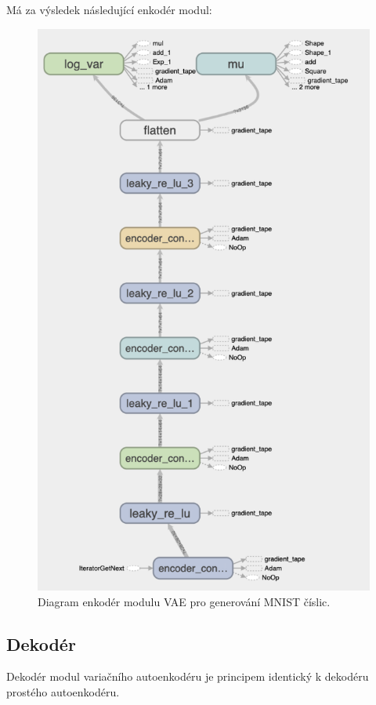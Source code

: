 Má za výsledek následující enkodér modul:
\begin{figure}[H]
    \centering
    \includegraphics{figures/vae_model_encoder.png}
    \caption{Diagram enkodér modulu VAE pro generování MNIST číslic.}
    \label{fig:vae_model_encoder}
\end{figure}

\subsection{Dekodér}
Dekodér modul variačního autoenkodéru je principem identický k dekodéru prostého autoenkodéru.

